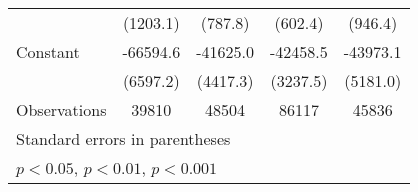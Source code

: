 {\begin{tabular*}{\textwidth}{@{\hskip\tabcolsep\extracolsep\fill}l*{4}{c}}
                    &    (1203.1)         &     (787.8)         &     (602.4)         &     (946.4)         \\
\addlinespace
Constant            &    -66594.6\sym{***}&    -41625.0\sym{***}&    -42458.5\sym{***}&    -43973.1\sym{***}\\
                    &    (6597.2)         &    (4417.3)         &    (3237.5)         &    (5181.0)         \\
\midrule
Observations        &       39810         &       48504         &       86117         &       45836         \\
\bottomrule
\multicolumn{5}{l}{\footnotesize Standard errors in parentheses}\\
\multicolumn{5}{l}{\footnotesize \sym{*} \(p<0.05\), \sym{**} \(p<0.01\), \sym{***} \(p<0.001\)}\\
\end{tabular*}
}
